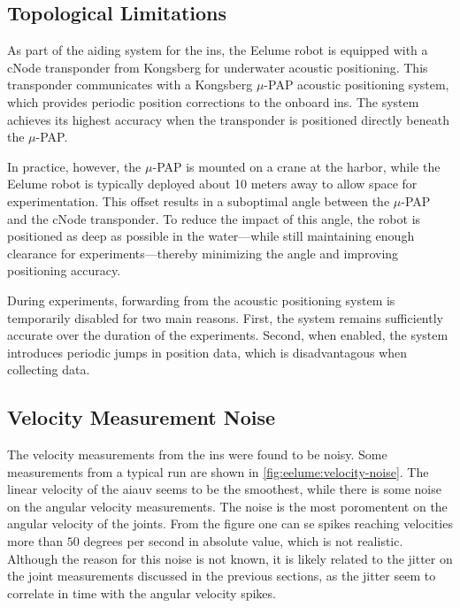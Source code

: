 \subsection*{Topological Limitations}
As part of the aiding system for the \gls{ins}, the Eelume robot is equipped 
with a cNode transponder from Kongsberg for underwater acoustic positioning. 
This transponder communicates with a Kongsberg \(\mu\)-PAP acoustic positioning 
system, which provides periodic position corrections to the onboard \gls{ins}. 
The system achieves its highest accuracy when the transponder is positioned 
directly beneath the \(\mu\)-PAP.

In practice, however, the \(\mu\)-PAP is mounted on a crane at the harbor, while the 
Eelume robot is typically deployed about 10 meters away to allow space for 
experimentation. This offset results in a suboptimal angle between the \(\mu\)-PAP 
and the cNode transponder. To reduce the impact of this angle, the robot is 
positioned as deep as possible in the water—while still maintaining enough 
clearance for experiments—thereby minimizing the angle and improving 
positioning accuracy.

During experiments, forwarding from the acoustic positioning system is 
temporarily disabled for two main reasons. First, the system remains 
sufficiently accurate over the duration of the experiments. Second, when 
enabled, the system introduces periodic jumps in position data, which is 
disadvantagous when collecting data.

\subsection*{Velocity Measurement Noise}
The velocity measurements from the \gls{ins} were found to be noisy. Some measurements
from a typical run are shown in \autoref{fig:eelume:velocity-noise}. The linear
velocity of the \gls{aiauv} seems to be the smoothest, while there is some noise
on the angular velocity measurements. The noise is the most poromentent on
the angular velocity of the joints. From the figure one can se spikes reaching
velocities more than \(50\) degrees per second in absolute value, which is not realistic. Although the
reason for this noise is not known, it is likely related to the jitter on the 
joint measurements discussed in the previous sections, as the jitter seem to correlate in time
with the angular velocity spikes.

